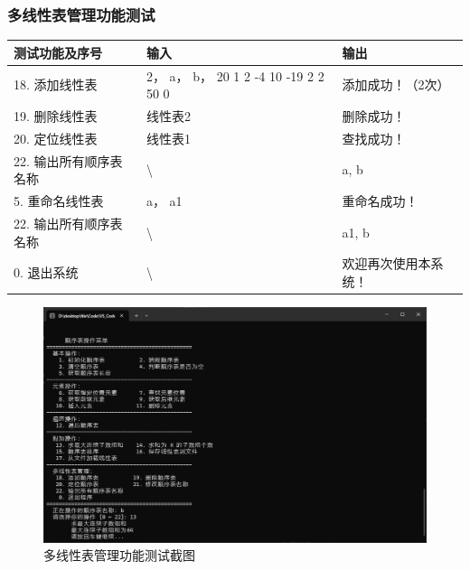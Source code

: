 \documentclass[supercite]{Experimental_Report}
\theoremstyle{definition}
\begin{document}
\subsubsection{多线性表管理功能测试}
    \begin{center}
        \setlength{\tabcolsep}{2.0mm}
        \label{table:multi-seqlist-test}
        \begin{tabularx}{\textwidth}{|X|X|X|}
            \hline
            测试功能及序号 & 输入 & 输出 \\\hline
            18. 添加线性表 & 2， a， b， 20 1 2 -4 10 -19 2 2 50 0 & 添加成功！（2次） \\\hline
            19. 删除线性表 & 线性表2 & 删除成功！ \\\hline
            20. 定位线性表 & 线性表1 & 查找成功！ \\\hline
            22. 输出所有顺序表名称 & \textbackslash & a, b \\\hline
            5. 重命名线性表 & a， a1 & 重命名成功！ \\\hline
            22. 输出所有顺序表名称 & \textbackslash & a1, b \\\hline
            0. 退出系统 & \textbackslash & 欢迎再次使用本系统！ \\\hline
        \end{tabularx}
    \end{center}

\begin{figure}[htb]
	\begin{center}
		\includegraphics[scale=0.30]{images/1-4.jpg}
		\caption{多线性表管理功能测试截图}
		\label{fig1-4}
	\end{center}
\end{figure}
\end{document}
